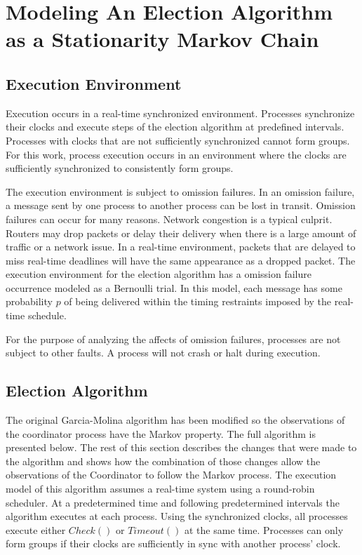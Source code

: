\section{Modeling An Election Algorithm as a Stationarity Markov Chain}



\subsection{Execution Environment}

Execution occurs in a real-time synchronized environment.
Processes synchronize their clocks and execute steps of the election algorithm at predefined intervals.
Processes with clocks that are not sufficiently synchronized cannot form groups.
For this work, process execution occurs in an environment where the clocks are sufficiently synchronized to consistently form groups.

The execution environment is subject to omission failures.
In an omission failure, a message sent by one process to another process can be lost in transit.
Omission failures can occur for many reasons.
Network congestion is a typical culprit.
Routers may drop packets or delay their delivery when there is a large amount of traffic or a network issue.
In a real-time environment, packets that are delayed to miss real-time deadlines will have the same appearance as a dropped packet.
The execution environment for the election algorithm has a omission failure occurrence modeled as a Bernoulli trial.
In this model, each message has some probability $p$ of being delivered within the timing restraints imposed by the real-time schedule.

For the purpose of analyzing the affects of omission failures, processes are not subject to other faults.
A process will not crash or halt during execution.

\subsection{Election Algorithm}

The original Garcia-Molina algorithm has been modified so the observations of the coordinator process have the Markov property.
The full algorithm is presented below.
The rest of this section describes the changes that were made to the algorithm and shows how the combination of those changes allow the observations of the Coordinator to follow the Markov process.
The execution model of this algorithm assumes a real-time system using a round-robin scheduler.
At a predetermined time and following predetermined intervals the algorithm executes at each process.
Using the synchronized clocks, all processes execute either $Check()$ or $Timeout()$ at the same time.
Processes can only form groups if their clocks are sufficiently in sync with another process' clock.

